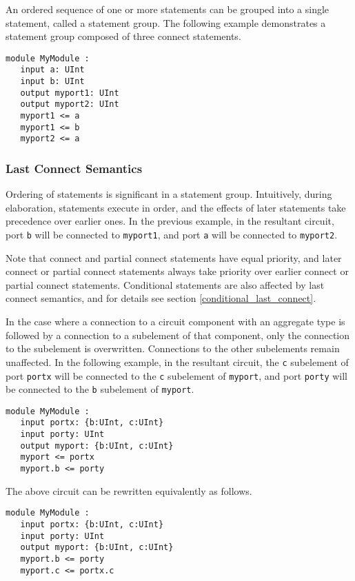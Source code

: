 \documentclass[12pt]{article}
\begin{document}
An ordered sequence of one or more statements can be grouped into a single statement, called a statement group. The following example demonstrates a statement group composed of three connect statements.

\begin{lstlisting}
module MyModule :
   input a: UInt
   input b: UInt
   output myport1: UInt
   output myport2: UInt
   myport1 <= a
   myport1 <= b
   myport2 <= a
\end{lstlisting}

\subsubsection{Last Connect Semantics}\label{last_connect}
Ordering of statements is significant in a statement group. Intuitively, during elaboration, statements execute in order, and the effects of later statements take precedence over earlier ones. In the previous example, in the resultant circuit, port \verb|b| will be connected to \verb|myport1|, and port \verb|a| will be connected to \verb|myport2|. 

Note that connect and partial connect statements have equal priority, and later connect or partial connect statements always take priority over earlier connect or partial connect statements. Conditional statements are also affected by last connect semantics, and for details see section \ref{conditional_last_connect}.

In the case where a connection to a circuit component with an aggregate type is followed by a connection to a subelement of that component, only the connection to the subelement is overwritten. Connections to the other subelements remain unaffected. In the following example, in the resultant circuit, the \verb|c| subelement of port \verb|portx| will be connected to the \verb|c| subelement of \verb|myport|, and port \verb|porty| will be connected to the \verb|b| subelement of \verb|myport|.
\begin{lstlisting}
module MyModule :
   input portx: {b:UInt, c:UInt}
   input porty: UInt
   output myport: {b:UInt, c:UInt}
   myport <= portx
   myport.b <= porty
\end{lstlisting}
The above circuit can be rewritten equivalently as follows.
\begin{lstlisting}
module MyModule :
   input portx: {b:UInt, c:UInt}
   input porty: UInt
   output myport: {b:UInt, c:UInt}
   myport.b <= porty
   myport.c <= portx.c
\end{lstlisting}
\end{document}
